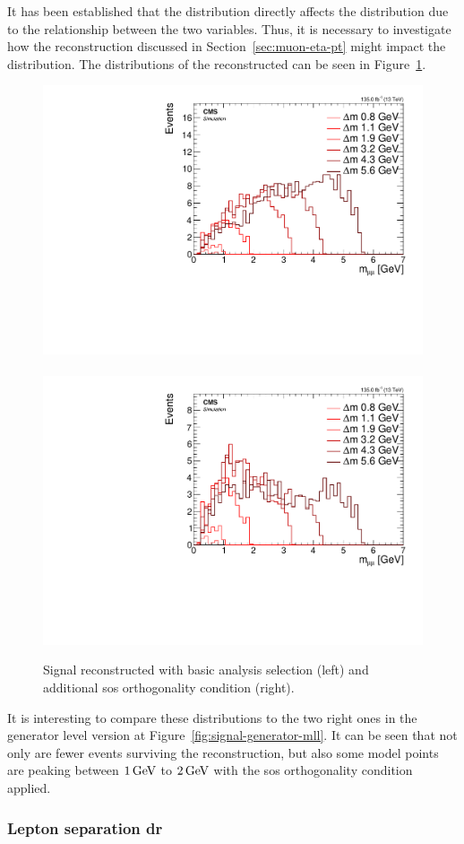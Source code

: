 It has been established that the \pt distribution directly affects the \mll distribution due to the relationship between the two variables. Thus, it is necessary to investigate how the reconstruction discussed in Section~\ref{sec:muon-eta-pt} might impact the \mmumu distribution. The distributions of the reconstructed \mmumu can be seen in Figure~\ref{fig:reco-signal-invamass}.

\begin{figure}[!htb]
\centering
\includegraphics[width=0.48\linewidth]{plots/signal_muons/none_invMassCorrJetNoMultIso10Dr0.6.pdf} \,
\includegraphics[width=0.48\linewidth]{plots/signal_muons/none_invMassCorrJetNoMultIso10Dr0.6_orth.pdf}  \\
\caption[Signal reconstructed \mmumu]{ Signal reconstructed \mmumu with basic analysis selection (left) and additional \gls{sos} orthogonality condition (right).}
\label{fig:reco-signal-invamass}
\end{figure}

It is interesting to compare these distributions to the two right ones in the generator level version at Figure~\ref{fig:signal-generator-mll}. It can be seen that not only are fewer events surviving the reconstruction, but also some \dm model points are peaking between $1 \,\text{Ge\hspace{-.08em}V}$ to $2 \,\text{Ge\hspace{-.08em}V}$ with the \gls{sos} orthogonality condition applied.

\subsubsection{Lepton separation \gls{dr}}
\label{sec:lepton-dr}


